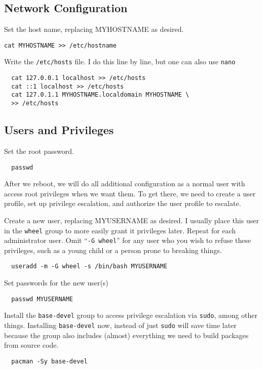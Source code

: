 \documentclass[letterpaper,12pt]{article}
\newcommand{\p}{\par\bigskip}
\begin{document}
\subsection{Network Configuration}
Set the host name, replacing MYHOSTNAME as desired.
\begin{lstlisting}
cat MYHOSTNAME >> /etc/hostname
\end{lstlisting} \p

Write the {\tt /etc/hosts} file. I do this line by line, but one can also use {\tt nano}
\begin{lstlisting}
  cat 127.0.0.1 localhost >> /etc/hosts
  cat ::1 localhost >> /etc/hosts
  cat 127.0.1.1 MYHOSTNAME.localdomain MYHOSTNAME \
  >> /etc/hosts
\end{lstlisting}


\subsection{Users and Privileges}
Set the root password.
\begin{lstlisting}
  passwd
\end{lstlisting} \p

After we reboot, we will do all additional configuration as a normal user with access root privileges when we want them. To get there, we need to create a user profile, set up privilege escalation, and authorize the user profile to escalate. \p

Create a new user, replacing MYUSERNAME as desired. I usually place this user in the {\tt wheel} group to more easily grant it privileges later. Repeat for each administrator user. Omit ``{\tt -G wheel}'' for any user who you wish to refuse these privileges, such as a young child or a person prone to breaking things.
\begin{lstlisting}
  useradd -m -G wheel -s /bin/bash MYUSERNAME
\end{lstlisting} \p

Set passwords for the new user(s)
\begin{lstlisting}
  passwd MYUSERNAME
\end{lstlisting}

Install the {\tt base-devel} group to access privilege escalation via {\tt sudo}, among other things. Installing {\tt base-devel} now, instead of just {\tt sudo} will save time later because the group also includes (almost) everything we need to build packages from source code.
\begin{lstlisting}
  pacman -Sy base-devel
\end{lstlisting} \p
\end{document}
